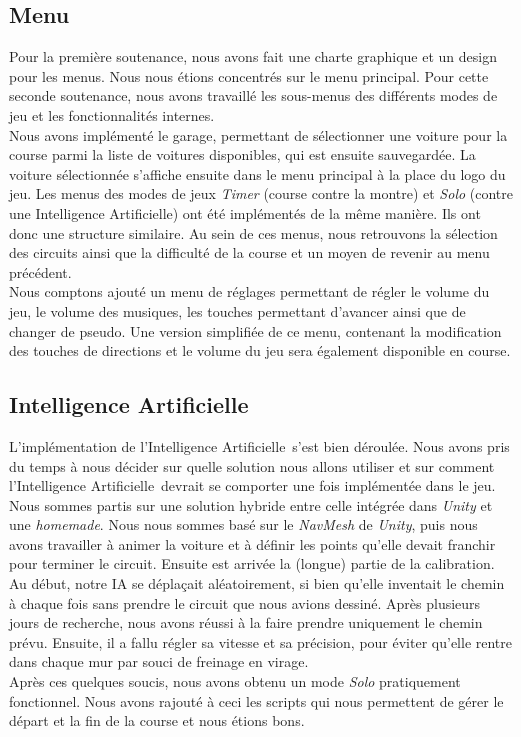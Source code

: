 \documentclass[12pt,a4paper]{article}
\newcommand{\AI}{Intelligence Artificielle}
\begin{document}
        \subsection{Menu}
            Pour la première soutenance, nous avons fait une charte graphique et un design pour les 
            menus.
            Nous nous étions concentrés sur le menu principal. Pour cette seconde soutenance, nous 
            avons travaillé les
            sous-menus des différents modes de jeu et les fonctionnalités internes.\\
            Nous avons implémenté le garage, permettant de
            sélectionner une voiture pour la course parmi la liste de voitures disponibles, qui
            est ensuite sauvegardée. La voiture sélectionnée s'affiche ensuite dans le menu principal
            à la place du logo du jeu. Les menus des modes de
            jeux \textsl{Timer} (course contre la montre) et \textsl{Solo} (contre une \AI) ont
            été implémentés de la même manière. Ils ont donc une structure similaire. Au sein de
            ces menus, nous retrouvons la sélection des circuits ainsi que la difficulté de la course et
            un moyen de revenir au menu précédent.\\
            Nous comptons ajouté un menu de réglages permettant de régler le volume du jeu, le volume
            des musiques, les touches permettant d'avancer ainsi que de changer de pseudo. Une 
            version simplifiée de ce menu, contenant la modification des touches de directions et le
            volume du jeu sera également disponible en course.

        \subsection{\AI}
            L'implémentation de l'\AI\, s'est bien déroulée. Nous avons pris du temps
            à nous décider sur quelle solution nous allons utiliser et sur comment
            l'\AI\, devrait se comporter une fois implémentée dans le jeu. Nous sommes partis sur une
            solution hybride entre celle intégrée dans \textsl{Unity} et une \textit{homemade}.
            Nous nous sommes basé sur le \textit{NavMesh} de \textsl{Unity}, puis nous avons
            travailler à animer la voiture et à définir les points qu'elle devait franchir pour
            terminer le circuit.  Ensuite est arrivée
            la (longue) partie de la calibration. Au début, notre IA se déplaçait aléatoirement,
            si bien qu'elle inventait le chemin à chaque fois sans prendre le circuit que nous
            avions dessiné. Après plusieurs jours de recherche, nous avons réussi à la faire
            prendre uniquement le chemin prévu. Ensuite, il a fallu régler sa vitesse et sa
            précision, pour éviter qu'elle rentre dans chaque mur par souci de freinage en virage.\\
            Après ces quelques soucis, nous avons obtenu un mode \textsl{Solo} pratiquement
            fonctionnel. Nous avons rajouté à ceci les scripts qui nous permettent de gérer
            le départ et la fin de la course et nous étions bons.
        
\end{document}
